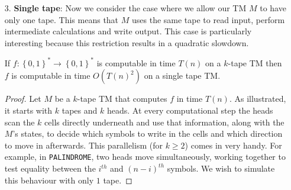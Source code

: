 \documentclass[usletter]{article}
\begin{document}
\begin{itemize}
\begin{proof}
    Now every cell holds two values: its original value before the fold and the symbol in the cell with which it overlaps after the fold. \(\tilde{M}\) also has an additional state for each tape, called FLIP which takes on two values. As the head moves across the tape, this state instructs it to only read one of these symbols (say the first one). This corresponds to the head moving to the right
    in the original TM \(M\). When any of \(M\)'s heads crosses over to the left of its starting position, \(\tilde{M}\) changes its state and starts reading the second symbol instead. In this way, changing the state FLIP corresponds to one of \(M\)'s heads moving across the edge of the fold in the original tape.
    The additional states and extended alphabet only produce a constant increase in runtime. 
\end{proof}

\begin{remark}
    A corollary of this theorem is that we can determine whether a certain language \(L\) is in \(\mathbf{DTIME}(T(n))\) by constructing a bidirectional tape to solve the problem in \(T(n)\). Then, by the theorem, the language is computable in \(O(T(n))\) with standard tapes.
\end{remark}



\item[3.] \textbf{Single tape}: Now we consider the case where we allow our TM \(M\) to have only one tape. This means that
\(M\) uses the same tape to read input, perform intermediate calculations and write output. This case is particularly interesting
because this restriction results in a quadratic slowdown. 

\begin{theorem}
    If \(f: \left\{ 0,1 \right\}^* \to \left\{  0,1 \right\}^*\) is computable in
    time \(T(n)\) on a \(k\)-tape TM then \(f\) is computable in 
    time \(O(T(n)^2)\) on a single tape TM.
\end{theorem}
\begin{proof}
    Let \(M\) be a \(k\)-tape TM that computes \(f\) in time \(T(n)\). As illustrated, 
    it starts with \(k\) tapes and \(k\) heads. At every computational step the heads 
    scan the \(k\) cells directly underneath and use that information, along with the 
    \(M\)'s states, to decide which symbols to write in the cells and which direction 
    to move in afterwards. This parallelism (for \(k \geq 2\)) comes in very handy. 
    For example, in \verb|PALINDROME|, two heads move simultaneously, working together
    to test equality between the \(i^{th}\) and \((n-i)^{th}\) symbols. We wish to simulate
    this behaviour with only \(1\) tape. 


\end{proof}
\end{itemize}
\end{document}
